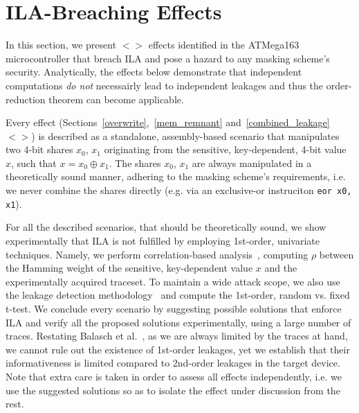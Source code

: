 \section{ILA-Breaching Effects}\label{sec:ila_effects}

In this section, we present $<>$ effects  identified in the ATMega163 microcontroller that breach ILA and pose a hazard to any masking scheme's security. Analytically, the effects below demonstrate that independent computations \emph{do not} necessairly lead to independent leakages and thus the order-reduction theorem can become applicable.

Every effect (Sections~\ref{overwrite},~\ref{mem_remnant} and~\ref{combined_leakage} $<>$) is described as a standalone, assembly-based scenario that manipulates two 4-bit shares $x_0$, $x_1$ originating from the sensitive, key-dependent, 4-bit value $x$, such that $x=x_0 \oplus x_1$. The shares $x_0$, $x_1$ are always manipulated in a theoretically sound manner, adhering to the masking scheme's requirements, i.e. we never combine the shares directly (e.g. via an exclusive-or instruciton \texttt{eor x0, x1}). 

For all the described scenarios, that should be theoretically sound, we show experimentally that ILA is not fulfilled by employing 1st-order, univariate techniques. Namely, we perform correlation-based analysis~\cite{DBLP:conf/ches/BrierCO04}, computing $\rho$ between the Hamming weight of the sensitive, key-dependent value $x$ and the experimentally acquired traceset. To maintain a wide attack scope, we also use the leakage detection methodology~\cite{tvla,DBLP:conf/ches/SchneiderM15} and compute the 1st-order, random vs. fixed t-test. 
 We conclude every scenario by suggesting possible solutions that enforce ILA and verify all the proposed solutions experimentally, using a large number of traces. Restating Balasch et al.~\cite{DBLP:conf/cardis/BalaschGGRS14}, as we are always limited by the traces at hand, we cannot rule out the existence of 1st-order leakages, yet we establish that their informativeness is limited compared to 2nd-order leakages in the target device. Note that extra care is taken in order to assess all effects independently, i.e. we use the suggested solutions so as to isolate the effect under discussion from the rest.

